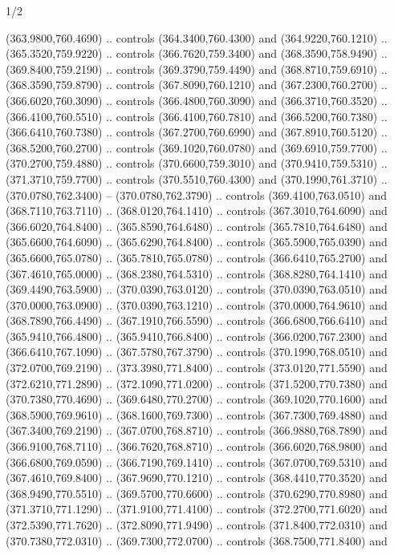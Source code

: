 \begin{flagdescription}{1/2}
\begin{scope}[xshift=0.5\flaglength]
\begin{scope}[scale=0.00745\flagwidth,xshift=-12.1mm,yshift=41.7mm]
\begin{scope}[y=0.80pt, x=0.80pt, yscale=-1, xscale=1, inner sep=0pt, outer sep=0pt]
\begin{scope}[cm={{1.33333,0.0,0.0,-1.33333,(0.0,114.66667)}}]
\begin{scope}[scale=0.100]
  (363.9800,760.4690) .. controls (364.3400,760.4300) and (364.9220,760.1210) ..
  (365.3520,759.9220) .. controls (366.7620,759.3400) and (368.3590,758.9490) ..
  (369.8400,759.2190) .. controls (369.3790,759.4490) and (368.8710,759.6910) ..
  (368.3590,759.8790) .. controls (367.8090,760.1210) and (367.2300,760.2700) ..
  (366.6020,760.3090) .. controls (366.4800,760.3090) and (366.3710,760.3520) ..
  (366.4100,760.5510) .. controls (366.4100,760.7810) and (366.5200,760.7380) ..
  (366.6410,760.7380) .. controls (367.2700,760.6990) and (367.8910,760.5120) ..
  (368.5200,760.2700) .. controls (369.1020,760.0780) and (369.6910,759.7700) ..
  (370.2700,759.4880) .. controls (370.6600,759.3010) and (370.9410,759.5310) ..
  (371.3710,759.7700) .. controls (370.5510,760.4300) and (370.1990,761.3710) ..
  (370.0780,762.3400) -- (370.0780,762.3790) .. controls (369.4100,763.0510) and
  (368.7110,763.7110) .. (368.0120,764.1410) .. controls (367.3010,764.6090) and
  (366.6020,764.8400) .. (365.8590,764.6480) .. controls (365.7810,764.6480) and
  (365.6600,764.6090) .. (365.6290,764.8400) .. controls (365.5900,765.0390) and
  (365.6600,765.0780) .. (365.7810,765.0780) .. controls (366.6410,765.2700) and
  (367.4610,765.0000) .. (368.2380,764.5310) .. controls (368.8280,764.1410) and
  (369.4490,763.5900) .. (370.0390,763.0120) .. controls (370.0390,763.0510) and
  (370.0000,763.0900) .. (370.0390,763.1210) .. controls (370.0000,764.9610) and
  (368.7890,766.4490) .. (367.1910,766.5590) .. controls (366.6800,766.6410) and
  (365.9410,766.4800) .. (365.9410,766.8400) .. controls (366.0200,767.2300) and
  (366.6410,767.1090) .. (367.5780,767.3790) .. controls (370.1990,768.0510) and
  (372.0700,769.2190) .. (373.3980,771.8400) .. controls (373.0120,771.5590) and
  (372.6210,771.2890) .. (372.1090,771.0200) .. controls (371.5200,770.7380) and
  (370.7380,770.4690) .. (369.6480,770.2700) .. controls (369.1020,770.1600) and
  (368.5900,769.9610) .. (368.1600,769.7300) .. controls (367.7300,769.4880) and
  (367.3400,769.2190) .. (367.0700,768.8710) .. controls (366.9880,768.7890) and
  (366.9100,768.7110) .. (366.7620,768.8710) .. controls (366.6020,768.9800) and
  (366.6800,769.0590) .. (366.7190,769.1410) .. controls (367.0700,769.5310) and
  (367.4610,769.8400) .. (367.9690,770.1210) .. controls (368.4410,770.3520) and
  (368.9490,770.5510) .. (369.5700,770.6600) .. controls (370.6290,770.8980) and
  (371.3710,771.1290) .. (371.9100,771.4100) .. controls (372.2700,771.6020) and
  (372.5390,771.7620) .. (372.8090,771.9490) .. controls (371.8400,772.0310) and
  (370.7380,772.0310) .. (369.7300,772.0700) .. controls (368.7500,771.8400) and

\end{scope}
\end{scope}
\end{scope}
\end{scope}
\end{scope}
\end{flagdescription}
